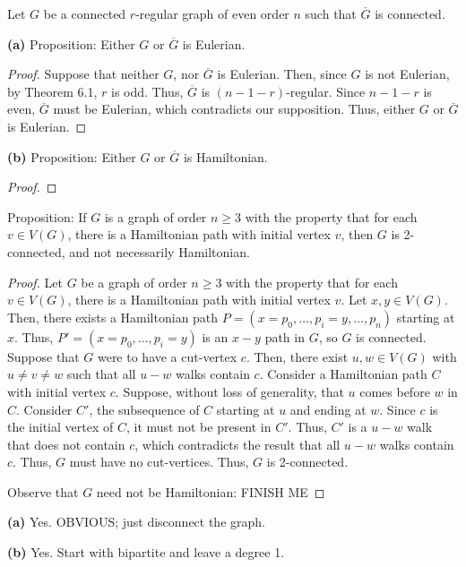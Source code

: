 \documentclass[12pt]{article}
\begin{document}
\newpage{} Let $G$ be a connected $r$-regular graph of even order $n$ such that $\overline G$ is connected.

{\bf (a)} Proposition: Either $G$ or $\overline G$ is Eulerian.
\begin{proof}
	Suppose that neither $G$, nor $\overline G$ is Eulerian.
	Then, since $G$ is not Eulerian, by Theorem 6.1, $r$ is odd.
	Thus, $\overline G$ is $(n-1-r)$-regular.
	Since $n-1-r$ is even, $\overline G$ must be Eulerian, which contradicts our supposition.
	Thus, either $G$ or $\overline G$ is Eulerian.
\end{proof}

{\bf (b)} Proposition: Either $G$ or $\overline G$ is Hamiltonian.
\begin{proof}
	
\end{proof}


\newpage{} Proposition: If $G$ is a graph of order $n \geq 3$ with the property that for each $v \in V(G)$, there is a Hamiltonian path with initial vertex $v$, then $G$ is 2-connected, and not necessarily Hamiltonian.
\begin{proof}
	Let $G$ be a graph of order $n \geq 3$ with the property that for each $v \in V(G)$, there is a Hamiltonian path with initial vertex $v$.
	Let $x, y \in V(G)$.
	Then, there exists a Hamiltonian path $P = (x = p_0, \hdots, p_i = y, \hdots, p_n)$ starting at $x$.
	Thus, $P' = (x = p_0, \hdots, p_i = y)$ is an $x-y$ path in $G$, so $G$ is connected.
	Suppose that $G$ were to have a cut-vertex $c$.
	Then, there exist $u,w \in V(G)$ with $u \neq v \neq w$ such that all $u-w$ walks contain $c$.
	Consider a Hamiltonian path $C$ with initial vertex $c$.
	Suppose, without loss of generality, that $u$ comes before $w$ in $C$.
	Consider $C'$, the subsequence of $C$ starting at $u$ and ending at $w$.
	Since $c$ is the initial vertex of $C$, it must not be present in $C'$.
	Thus, $C'$ is a $u-w$ walk that does not contain $c$, which contradicts the result that all $u-w$ walks contain $c$.
	Thus, $G$ must have no cut-vertices.
	Thus, $G$ is 2-connected.

	Observe that $G$ need not be Hamiltonian: FINISH ME
\end{proof}

\newpage{}

	{\bf (a)} Yes. OBVIOUS; just disconnect the graph.

	{\bf (b)} Yes. Start with bipartite and leave a degree 1.

\newpage{}



\newpage{}

\newpage{}
\end{document}
